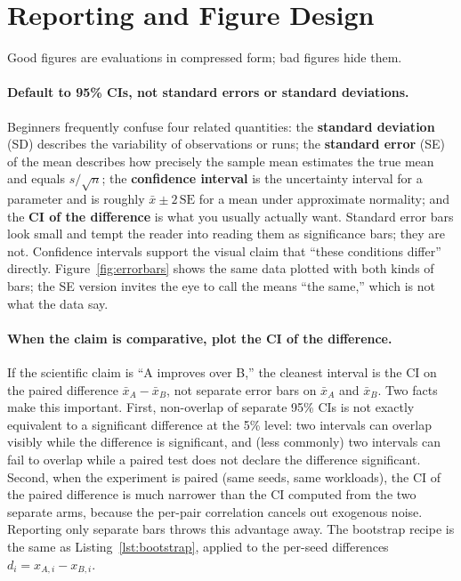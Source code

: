 \documentclass[11pt]{article}
\begin{document}
\section{Reporting and Figure Design}
\label{sec:reporting}

Good figures are evaluations in compressed form; bad figures hide them.

\paragraph{Default to 95\% CIs, not standard errors or standard deviations.} Beginners frequently confuse four related quantities: the \textbf{standard deviation} (SD) describes the variability of observations or runs; the \textbf{standard error} (SE) of the mean describes how precisely the sample mean estimates the true mean and equals $s/\sqrt{n}$; the \textbf{confidence interval} is the uncertainty interval for a parameter and is roughly $\bar{x}\pm 2\,\mathrm{SE}$ for a mean under approximate normality; and the \textbf{CI of the difference} is what you usually actually want. Standard error bars look small and tempt the reader into reading them as significance bars; they are not. Confidence intervals support the visual claim that ``these conditions differ'' directly. Figure~\ref{fig:errorbars} shows the same data plotted with both kinds of bars; the SE version invites the eye to call the means ``the same,'' which is not what the data say.

\paragraph{When the claim is comparative, plot the CI of the difference.} If the scientific claim is ``A improves over B,'' the cleanest interval is the CI on the paired difference $\bar{x}_A - \bar{x}_B$, not separate error bars on $\bar{x}_A$ and $\bar{x}_B$. Two facts make this important. First, non-overlap of separate 95\% CIs is not exactly equivalent to a significant difference at the 5\% level: two intervals can overlap visibly while the difference is significant, and (less commonly) two intervals can fail to overlap while a paired test does not declare the difference significant. Second, when the experiment is paired (same seeds, same workloads), the CI of the paired difference is much narrower than the CI computed from the two separate arms, because the per-pair correlation cancels out exogenous noise. Reporting only separate bars throws this advantage away. The bootstrap recipe is the same as Listing~\ref{lst:bootstrap}, applied to the per-seed differences $d_i = x_{A,i} - x_{B,i}$.
\end{document}

